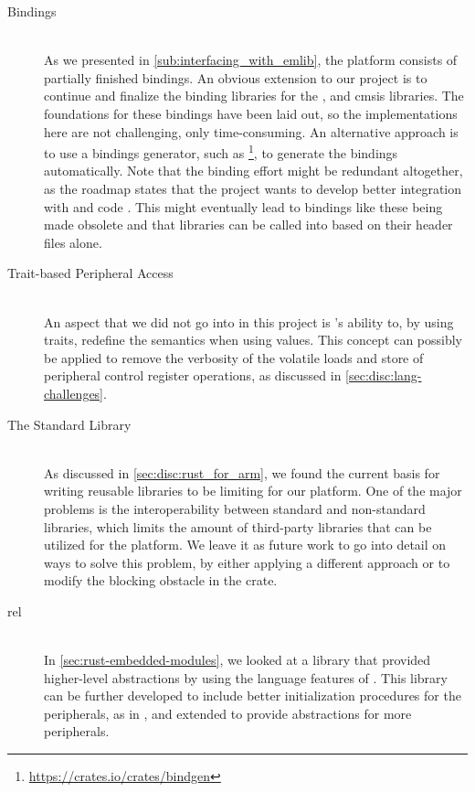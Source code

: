 \begin{description}
\item[Bindings] \hfill \\
  As we presented in \autoref{sub:interfacing_with_emlib}, the {\rg} platform consists of partially finished bindings.
  An obvious extension to our project is to continue and finalize the binding libraries for the {\emlib}, {\emdrv} and \gls{cmsis} libraries.
  The foundations for these bindings have been laid out, so the implementations here are not challenging, only time-consuming.
  An alternative approach is to use a bindings generator, such as \footnote{\url{https://crates.io/crates/bindgen}}, to generate the bindings automatically.
  Note that the binding effort might be redundant altogether, as the {\rust} roadmap states that the project wants to develop better integration with {\C} and {\Cpp} code \cite{web:roadmap}.
  This might eventually lead to bindings like these being made obsolete and that {\C} libraries can be called into based on their header files alone.

\item[Trait-based Peripheral Access] \hfill \\
  An aspect that we did not go into in this project is {\rust}'s ability to, by using traits, redefine the semantics when using values.
  This concept can possibly be applied to remove the verbosity of the volatile loads and store of peripheral control register operations, as discussed in \autoref{sec:disc:lang-challenges}.

\item[The Standard Library] \hfill \\
  As discussed in \autoref{sec:disc:rust_for_arm}, we found the current basis for writing reusable libraries to be limiting for our platform.
  One of the major problems is the interoperability between standard and non-standard libraries, which limits the amount of third-party libraries that can be utilized for the {\rg} platform.
  We leave it as future work to go into detail on ways to solve this problem, by either applying a different approach or to modify the blocking obstacle in the  crate.

\item[\glsdesc{rel}] \hfill \\
  In \autoref{sec:rust-embedded-modules}, we looked at a library that provided higher-level abstractions by using the language features of {\rust}.
  This library can be further developed to include better initialization procedures for the peripherals, as in {\zinc}, and extended to provide abstractions for more peripherals.


\end{description}
